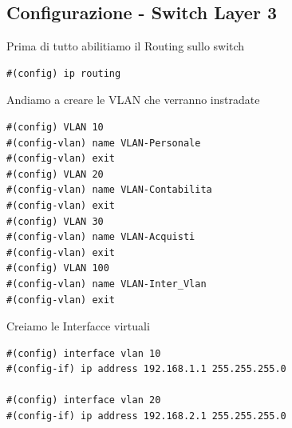 \documentclass[12pt]{article}
\begin{document}
    \subsection{Configurazione - Switch Layer 3}
        \begin{center}
            Prima di tutto abilitiamo il Routing sullo switch
            \begin{tcolorbox}[title=Multilayer Switch, colframe=gray!50!gray, colback=white!50!white]
                \begin{lstlisting}
#(config) ip routing
                \end{lstlisting}
            \end{tcolorbox}
            Andiamo a creare le VLAN che verranno instradate 
            \begin{tcolorbox}[title=Multilayer Switch, colframe=gray!50!gray, colback=white!50!white]
                \begin{lstlisting}
#(config) VLAN 10
#(config-vlan) name VLAN-Personale
#(config-vlan) exit
#(config) VLAN 20
#(config-vlan) name VLAN-Contabilita
#(config-vlan) exit
#(config) VLAN 30
#(config-vlan) name VLAN-Acquisti
#(config-vlan) exit
#(config) VLAN 100
#(config-vlan) name VLAN-Inter_Vlan
#(config-vlan) exit
                \end{lstlisting}
            \end{tcolorbox}
            Creiamo le Interfacce virtuali
            \begin{tcolorbox}[title=Multilayer Switch, colframe=gray!50!gray, colback=white!50!white]
                \begin{lstlisting}
#(config) interface vlan 10
#(config-if) ip address 192.168.1.1 255.255.255.0

#(config) interface vlan 20
#(config-if) ip address 192.168.2.1 255.255.255.0


\end{lstlisting}
\end{tcolorbox}
\end{center}
\end{document}
